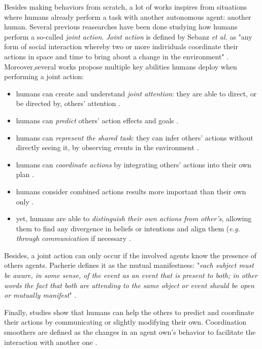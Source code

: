 \documentclass[a4paper,11pt,twoside]{StyleThese}
\begin{document}
Besides making behaviors from scratch, a lot of works inspires from situations where humans already perform a task with another autonomous agent: another human. Several previous reasearches have been done studying how humans perform a so-called \textit{joint action}. \textit{Joint action} is defined by Sebanz \textit{et al.} as "any form of social interaction whereby two or more individuals coordinate their actions in space and time to bring about a change in the environment" \cite{sebanz2006joint}. Moreover,several works propose multiple key abilities humans deploy when performing a joint action:
\begin{itemize}
\item humans can create and understand \textit{joint attention}: they are able to direct, or be directed by, others' attention \cite{pacherie_phenomenology_2011, sebanz2006joint}.
\item humans can \textit{predict} others' action effects and goals \cite{tomasello2005understanding, sebanz2006joint}.
\item humans can \textit{represent the shared task}: they can infer others' actions without directly seeing it, by observing events in the environment \cite{knoblich2011psychological, sebanz2006joint}.
\item humans can \textit{coordinate actions} by integrating others' actions into their own plan \cite{sebanz2006joint}.
\item humans consider combined actions results more important than their own only \cite{sebanz2006joint}.
\item yet, humans are able to \textit{distinguish their own actions from other's}, allowing them to find any divergence in beliefs or intentions and align them (\textit{e.g. through communication} if necessary \cite{pacherie_phenomenology_2011}.
\end{itemize}

Besides, a joint action can only occur if the involved agents know the presence of others agents. Pacherie defines it as the mutual manifestness: "\textit{each subject must be aware, in some sense, of the event as an event that is present to both; in other words the fact that both are attending to the same object or event should be open or mutually manifest}" \cite{pacherie_phenomenology_2011}.

Finally, studies show that humans can help the others to predict and coordinate their actions by communicating or slightly modifying their own. Coordination smoothers are defined as the changes in an agent own's behavior to facilitate the interaction with another one \cite{vesper_minimal_2010}.
\end{document}
